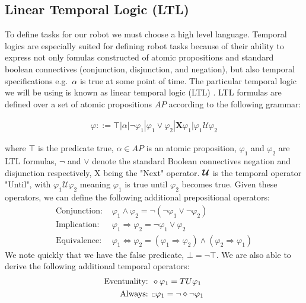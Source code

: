 \subsection{Linear Temporal Logic (LTL)}
To define tasks for our robot we must choose a high level language. Temporal logics are especially suited for defining robot tasks because of their ability to express not only fomulas constructed of atomic propositions and standard boolean connectives (conjunction, disjunction, and negation), but also temporal specifications e.g.\ $\alpha$ is true at some point of time. The particular temporal logic we will be using is known as linear temporal logic (LTL) \cite{clarke99}. LTL formulas are defined over a set of atomic propositions $AP$ according to the following grammar:

\begin{align*}
    \varphi ::= \top | \alpha | \neg \varphi_1 | \varphi_1  \lor \varphi_2 | \textbf{X} \varphi_1 | \varphi_1 \bm{\mathcal{U}} \varphi_2
\end{align*}

where $\top$ is the predicate true, $\alpha \in AP$ is an atomic proposition, $\varphi_1$ and $\varphi_2$ are LTL formulas, $\neg$ and $\lor$ denote the standard Boolean connectives negation and disjunction respectively, X being the "Next" operator. $\bm{\mathcal{U}}$ is the temporal operator "Until", with $\varphi_1 \mathcal{U} \varphi_2$ meaning $\varphi_1$ is true until $\varphi_2$ becomes true. Given these operators, we can define the following additional prepositional operators:
\begin{align*}
    \text{Conjunction: }&  \varphi_1  \land \varphi_2 = \neg(\neg \varphi_1 \lor \neg \varphi_2) \\
    \text{Implication: }& \varphi_1 \Rightarrow \varphi_2 = \neg \varphi_1 \lor \varphi_2 \\
    \text{Equivalence: }& \varphi_1 \Leftrightarrow \varphi_2 = (\varphi_1 \Rightarrow \varphi_2) \land (\varphi_2 \Rightarrow \varphi_1)
\end{align*}
We note quickly that we have the false predicate, $\bot = \neg \top$.
We are also able to derive the following additional temporal operators:
\begin{align*}
    \text{Eventuality: }& \diamond \varphi_1 = T U \varphi_1 \\
    \text{Always: }& \ssquare \varphi_1 = \neg \diamond \neg \varphi_1
\end{align*}

